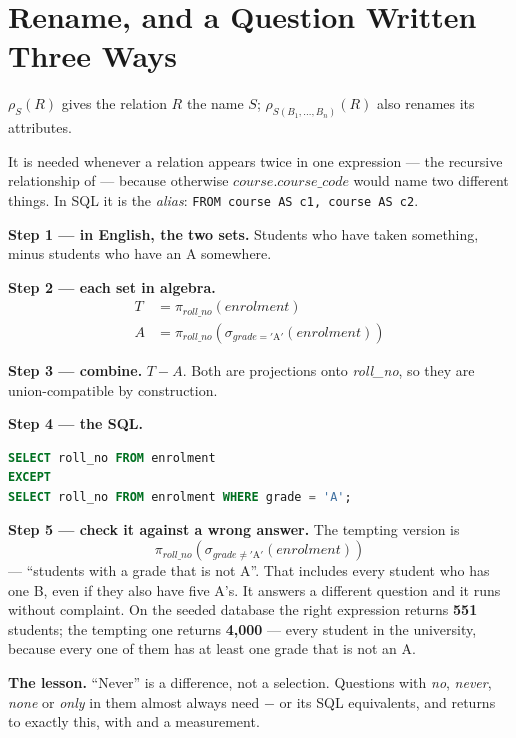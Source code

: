 \section{Rename, and a Question Written Three Ways}

\begin{definitionbox}[Rename]
 $\rho_{S}(R)$ gives the relation $R$ the name $S$;
$\rho_{S(B_1,\dots,B_n)}(R)$ also renames its attributes.

\smallskip
It is needed whenever a relation appears twice in one expression --- the
recursive relationship of  --- because otherwise
$\mathit{course.course\_code}$ would name two different things. In SQL it is
the \emph{alias}: \texttt{FROM course AS c1, course AS c2}.
\end{definitionbox}

\begin{worked}
\textbf{Step 1 --- in English, the two sets.} Students who have taken
something, minus students who have an A somewhere.

\medskip
\textbf{Step 2 --- each set in algebra.}
\begin{align*}
  T &= \pi_{\mathit{roll\_no}}(\mathit{enrolment}) \\
  A &= \pi_{\mathit{roll\_no}}(\sigma_{\mathit{grade}=\mathrm{'A'}}
        (\mathit{enrolment}))
\end{align*}

\textbf{Step 3 --- combine.} $T - A$. Both are projections onto
\textit{roll\_no}, so they are union-compatible by construction.

\medskip
\textbf{Step 4 --- the SQL.}
\begin{lstlisting}[language=sql]
SELECT roll_no FROM enrolment
EXCEPT
SELECT roll_no FROM enrolment WHERE grade = 'A';
\end{lstlisting}

\medskip
\textbf{Step 5 --- check it against a wrong answer.} The tempting version is
\[
  \pi_{\mathit{roll\_no}}(\sigma_{\mathit{grade} \neq \mathrm{'A'}}
  (\mathit{enrolment}))
\]
--- ``students with a grade that is not A''. That includes every student who
has one B, even if they also have five A's. It answers a different question
and it runs without complaint. On the seeded database the right expression
returns \textbf{551} students; the tempting one returns \textbf{4{,}000} ---
every student in the university, because every one of them has at least one
grade that is not an A.

\smallskip
\textbf{The lesson.} ``Never'' is a difference, not a selection. Questions
with \emph{no}, \emph{never}, \emph{none} or \emph{only} in them almost
always need $-$ or its SQL equivalents, and  returns to
exactly this, with  and a measurement.
\end{worked}

